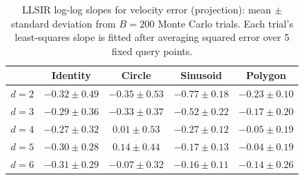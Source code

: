 \begin{table}[htbp]
\small
\centering
\begin{tabular}{lcccc}
\toprule
 & Identity & Circle & Sinusoid & Polygon \\
\midrule
$d=2$ & $-0.32 \pm 0.49$ & $-0.35 \pm 0.53$ & $-0.77 \pm 0.18$ & $-0.23 \pm 0.10$ \\
$d=3$ & $-0.29 \pm 0.36$ & $-0.33 \pm 0.37$ & $-0.52 \pm 0.22$ & $-0.17 \pm 0.20$ \\
$d=4$ & $-0.27 \pm 0.32$ & $0.01 \pm 0.53$ & $-0.27 \pm 0.12$ & $-0.05 \pm 0.19$ \\
$d=5$ & $-0.30 \pm 0.28$ & $0.14 \pm 0.44$ & $-0.17 \pm 0.13$ & $-0.04 \pm 0.19$ \\
$d=6$ & $-0.31 \pm 0.29$ & $-0.07 \pm 0.32$ & $-0.16 \pm 0.11$ & $-0.14 \pm 0.26$ \\
\bottomrule
\end{tabular}
\caption{LLSIR log-log slopes for velocity error (projection): mean $\pm$ standard deviation from $B=200$ Monte Carlo trials. Each trial's least-squares slope is fitted after averaging squared error over 5 fixed query points. }
\label{tab:vel}
\end{table}
